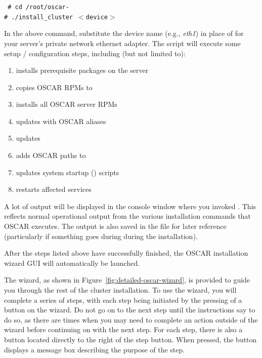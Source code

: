 \vspace{11pt}
{\tt
\# cd /root/oscar-\oscarversion \\
\indent \# ./install\_cluster $<$device$>$
}
\vspace{11pt}
  
In the above command, substitute the device name (e.g., \emph{eth1})
in place of  for your server's private network
ethernet adapter.  The script will execute some setup / configuration
steps, including (but not limited to):

\begin{enumerate}
\item installs prerequisite packages on the server
\item copies OSCAR RPMs to 
\item installs all OSCAR server RPMs
\item updates  with OSCAR aliases
\item updates  
\item adds OSCAR paths to  
\item updates system startup () scripts
\item restarts affected services
\end{enumerate}

A lot of output will be displayed in the console window where you
invoked .  This reflects normal operational
output from the various installation commands that OSCAR executes.
The output is also saved in the file  for later
reference (particularly if something goes during during the
installation).

After the steps listed above have successfully finished, the OSCAR
installation wizard GUI will automatically be launched.
  
The wizard, as shown in Figure~\ref{fig:detailed-oscar-wizard}, is
provided to guide you through the rest of the cluster installation.
To use the wizard, you will complete a series of steps, with each step
being initiated by the pressing of a button on the wizard. Do not go
on to the next step until the instructions say to do so, as there are
times when you may need to complete an action outside of the wizard
before continuing on with the next step. For each step, there is also
a  button located directly to the right of the step
button.  When pressed, the  button displays a message box
describing the purpose of the step.

